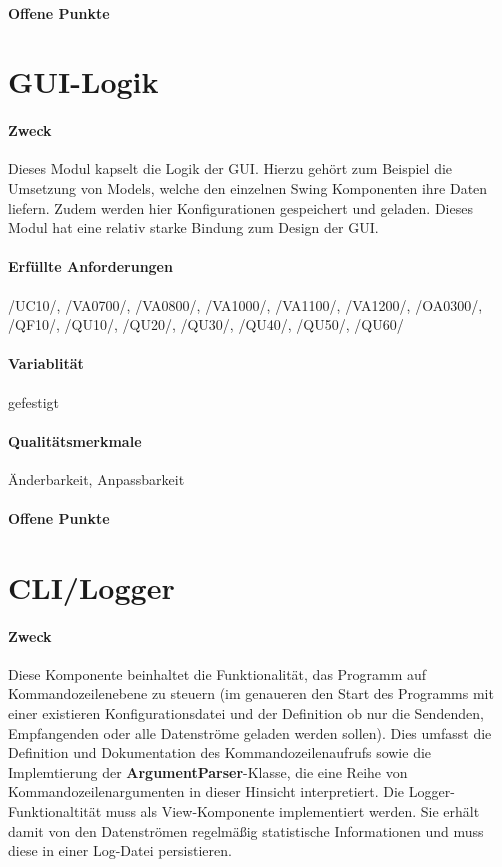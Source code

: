 \paragraph{Offene Punkte}

\section{GUI-Logik}
\label{sec:4:konf}

\paragraph{Zweck}
Dieses Modul kapselt die Logik der GUI. Hierzu gehört zum Beispiel die 
Umsetzung von Models, welche den einzelnen Swing Komponenten ihre Daten liefern.
Zudem werden hier Konfigurationen gespeichert und geladen.
Dieses Modul hat eine relativ starke Bindung zum Design der GUI. 

\paragraph{Erfüllte Anforderungen}
/UC10/, /VA0700/, /VA0800/, /VA1000/, /VA1100/, /VA1200/, /OA0300/, /QF10/, /QU10/, /QU20/, /QU30/, /QU40/, /QU50/, /QU60/

\paragraph{Variablität}
gefestigt
\paragraph{Qualitätsmerkmale}
Änderbarkeit, Anpassbarkeit
\paragraph{Offene Punkte}

\section{CLI/Logger}
\label{sec:4:konf}

\paragraph{Zweck}
Diese Komponente beinhaltet die Funktionalität, das Programm auf
Kommandozeilenebene zu steuern (im genaueren den Start des Programms mit einer
existieren Konfigurationsdatei und der Definition ob nur die Sendenden,
Empfangenden oder alle Datenströme geladen werden sollen). Dies umfasst die
Definition und Dokumentation des Kommandozeilenaufrufs sowie die Implemtierung
der \textbf{ArgumentParser}-Klasse, die eine Reihe von Kommandozeilenargumenten
in dieser Hinsicht interpretiert. Die Logger-Funktionaltität muss als
View-Komponente implementiert werden. Sie erhält damit von den Datenströmen
regelmäßig statistische Informationen und muss diese in einer Log-Datei
persistieren.
